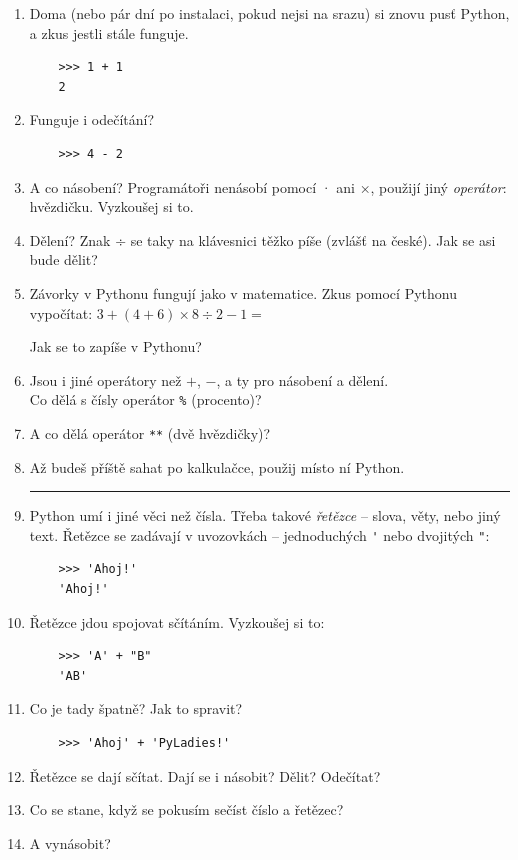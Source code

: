 \documentclass[a4paper,10pt]{article}
\newcommand\answerspace{\\\rule[0cm]{0pt}{1cm}}
\begin{document}
\begin{enumerate}
\item Doma (nebo pár dní po instalaci, pokud nejsi na srazu) si znovu pusť Python,
    a zkus jestli stále funguje.
    \begin{verbatim}
    >>> 1 + 1
    2
    \end{verbatim}
\item Funguje i odečítání?
    \begin{verbatim}
    >>> 4 - 2
    \end{verbatim}
\item A co násobení? Programátoři nenásobí pomocí · ani ×, použijí jiný \emph{operátor}: hvězdičku. Vyzkoušej si to.
\item Dělení? Znak ÷ se taky na klávesnici těžko píše (zvlášť na české). Jak se asi bude dělit?
\item Závorky v Pythonu fungují jako v matematice.
    Zkus pomocí Pythonu vypočítat: $3 + (4 + 6) \times 8 \div 2 - 1 = $

    Jak se to zapíše v Pythonu?
    \answerspace
\item Jsou i jiné operátory než $+$, $-$, a ty pro násobení a dělení.
    \\Co dělá s čísly operátor \verb+%+ (procento)?
\item A co dělá operátor \verb+**+ (dvě hvězdičky)?
\item Až budeš příště sahat po kalkulačce, použij místo ní Python.

    \bigskip\bigskip\hrule\bigskip\bigskip

\item Python umí i jiné věci než čísla. Třeba takové \emph{řetězce} – slova, věty, nebo jiný text.
    Řetězce se zadávají v uvozovkách – jednoduchých \verb|'| nebo dvojitých \verb|"|:
    \begin{verbatim}
    >>> 'Ahoj!'
    'Ahoj!'
    \end{verbatim}
\item Řetězce jdou spojovat sčítáním. Vyzkoušej si to:
    \begin{verbatim}
    >>> 'A' + "B"
    'AB'
    \end{verbatim}
\item Co je tady špatně? Jak to spravit?
    \begin{verbatim}
    >>> 'Ahoj' + 'PyLadies!'
    \end{verbatim}
\item Řetězce se dají sčítat. Dají se i násobit? Dělit? Odečítat?
    \answerspace
\item Co se stane, když se pokusím sečíst číslo a řetězec?
    \answerspace
\item A vynásobit?

\end{enumerate}
\end{document}
